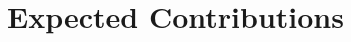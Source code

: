 \documentclass[12pt,a4paper]{article}
\begin{document}
%
%
%
%
%

\section{Expected Contributions}
\end{document}

